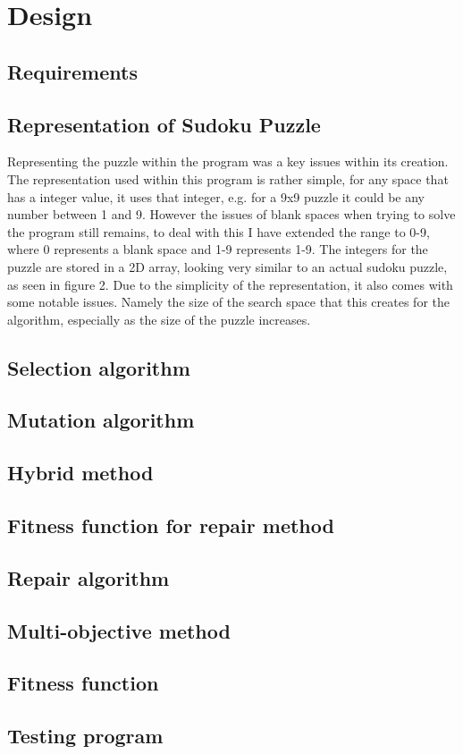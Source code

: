 \documentclass[a4paper,11pt]{article}
\begin{document}
\section{Design}

\subsection{Requirements}

\subsection{Representation of Sudoku Puzzle}
Representing the puzzle within the program was a key issues within its creation. The representation used within this program is rather simple, for any space that has a integer value, it uses that integer, e.g. for a 9x9 puzzle it could be any number between 1 and 9. However the issues of blank spaces when trying to solve the program still remains, to deal with this I have extended the range to 0-9, where 0 represents a blank space and 1-9 represents 1-9. The integers for the puzzle are stored in a 2D array, looking very similar to an actual sudoku puzzle, as seen in figure 2.
Due to the simplicity of the representation, it also comes with some notable issues. Namely the size of the search space that this creates for the algorithm, especially as the size of the puzzle increases. 
\subsection{Selection algorithm}

\subsection{Mutation algorithm}

\subsection{Hybrid method}

\subsection{Fitness function for repair method}

\subsection{Repair algorithm}

\subsection{Multi-objective method}

\subsection{Fitness function}

\subsection{Testing program }
\end{document}
